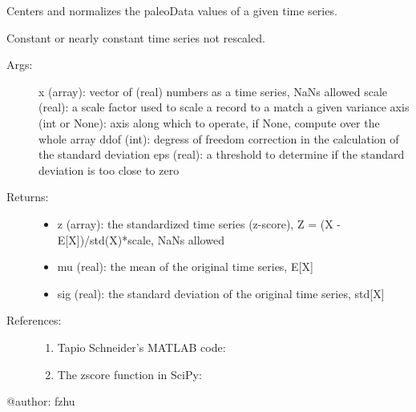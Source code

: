 \documentclass[letterpaper,10pt,english]{sphinxmanual}
\begin{document}
\begin{fulllineitems}
\label{\detokenize{Main:pyleoclim.standardizeTs}}
Centers and normalizes the paleoData values of a  given time series.

Constant or nearly constant time series not rescaled.
\begin{description}
\item[{Args:}] \leavevmode
x (array): vector of (real) numbers as a time series, NaNs allowed
scale (real): a scale factor used to scale a record to a match a given variance
axis (int or None): axis along which to operate, if None, compute over the whole array
ddof (int): degress of freedom correction in the calculation of the standard deviation
eps (real): a threshold to determine if the standard deviation is too close to zero

\item[{Returns:}] \leavevmode\begin{itemize}
\item {} 
z (array): the standardized time series (z-score), Z = (X - E{[}X{]})/std(X)*scale, NaNs allowed

\item {} 
mu (real): the mean of the original time series, E{[}X{]}

\item {} 
sig (real): the standard deviation of the original time series, std{[}X{]}

\end{itemize}

\item[{References:}] \leavevmode\begin{enumerate}
\item {} 
Tapio Schneider’s MATLAB code: 

\item {} 
The zscore function in SciPy: 

\end{enumerate}

\end{description}

@author: fzhu

\end{fulllineitems}

\end{document}
